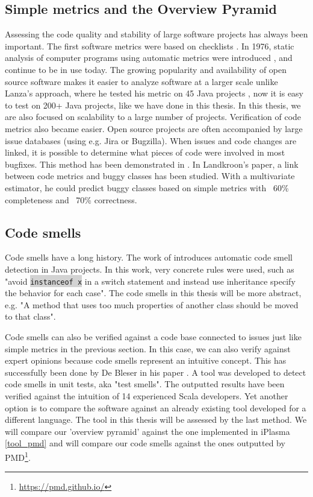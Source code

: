 \documentclass[onecolumn]{article}
\newcommand{\code}[1]{\colorbox{lightgray}{\texttt{#1}}}
\begin{document}
\subsection{Simple metrics and the Overview Pyramid}
Assessing the code quality and stability of large software projects has always been important. The first software metrics were based on checklists \cite{jeanrenaud1970software}. In 1976, static analysis of computer programs using automatic metrics were introduced \cite{mccabe1976complexity}, and continue to be in use today. The growing popularity and availability of open source software makes it easier to analyze software at a larger scale \cite{syeed2013evolution} unlike Lanza's approach, where he tested his metric on 45 Java projects \cite{lanza2007object}, now it is easy to test on 200+ Java projects, like we have done in this thesis. In this thesis, we are also focused on scalability to a large number of projects.
Verification of code metrics also became easier. Open source projects are often accompanied by large issue databases (using e.g. Jira or Bugzilla). When issues and code changes are linked, it is possible to determine what pieces of code were involved in most bugfixes.
This method has been demonstrated in \cite{Landkroon2017CodeQualityEvaluationScala}. In Landkroon's paper, a link between code metrics and buggy classes has been studied. With a multivariate estimator, he could predict buggy classes based on simple metrics with ~60\% completeness and ~70\% correctness. 


\subsection{Code smells}
Code smells have a long history. The work of \cite{van2002java} introduces automatic code smell detection in Java projects. In this work, very concrete rules were used, such as "avoid \code{instanceof x} in a switch statement and instead use inheritance specify the behavior for each case". The code smells in this thesis will be more abstract, e.g. "A method that uses too much properties of another class should be moved to that class".

Code smells can also be verified against a code base connected to issues just like simple metrics in the previous section. In this case, we can also verify against expert opinions because code smells represent an intuitive concept. This has successfully been done by De Bleser in his paper \cite{de2019assessing}. A tool was developed to detect code smells in unit tests, aka "test smells". The outputted results have been verified against the intuition of 14 experienced Scala developers. Yet another option is to compare the software against an already existing tool developed for a different language. 
The tool in this thesis will be assessed by the last method. We will compare our 'overview pyramid' against the one implemented in iPlasma \ref{tool_pmd} \cite{Marinescu05iplasma} and will compare our code smells against the ones outputted by PMD\footnote{\url{https://pmd.github.io/}}.
\end{document}
